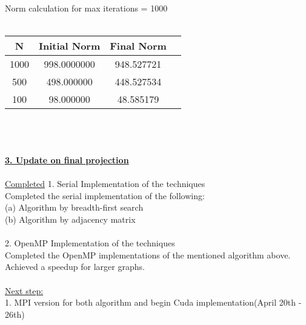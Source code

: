 \documentclass[12pt,letterpaper]{article}
\begin{document}
Norm calculation for max iterations = 1000 \\\\
\begin{tabular}{ |c|c|c|c| } 
 \hline
N &Initial Norm & Final Norm  \\
 \hline\hline
 1000 & 998.0000000 &  948.527721  \\
 \hline
500 & 498.000000 &  448.527534 \\
\hline
100 & 98.000000 &  48.585179  \\
\hline

\end{tabular} \\\\\\
\underline{\textbf{3. Update on final projection}} \\\\
\underline{Completed}
1. Serial Implementation of the techniques \\
Completed the serial implementation of the following:\\
(a) Algorithm by breadth-first search\\ (b) Algorithm by adjacency matrix\\\\
2. OpenMP Implementation of the techniques \\
Completed the OpenMP implementations of the mentioned algorithm above. \\
Achieved a speedup for larger graphs. \\\\
\underline{Next step:}\\
1. MPI version for both algorithm and begin Cuda implementation(April 20th - 26th)\\
\end{document}
